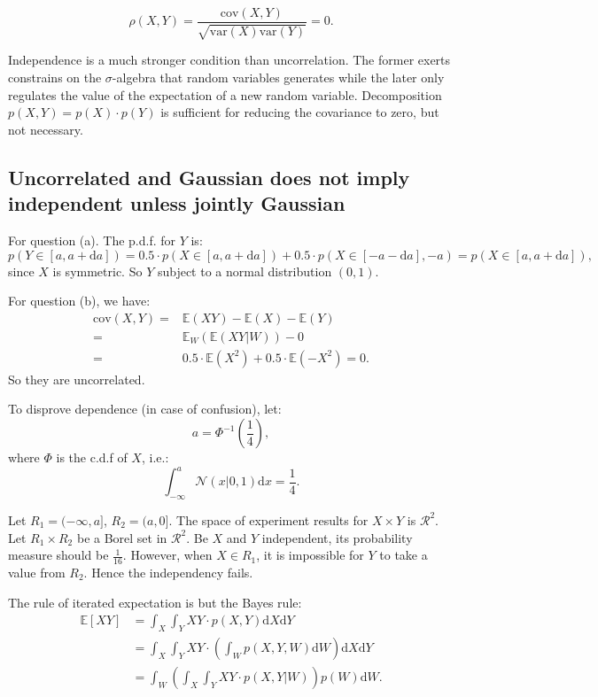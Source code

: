 \documentclass[UTF8]{ctexart}
\begin{document}
$$\rho(X,Y)=\frac{\text{cov}(X,Y)}{\sqrt{\text{var}(X)\text{var}(Y)}}=0.$$

Independence is a much stronger condition than uncorrelation.
The former exerts constrains on the $\sigma$-algebra that random variables generates while the later only regulates the value of the expectation of a new random variable.
Decomposition $p(X,Y)=p(X)\cdot p(Y)$ is sufficient for reducing the covariance to zero, but not necessary.

\subsection{Uncorrelated and Gaussian does not imply independent unless jointly Gaussian}
For question (a).
The p.d.f. for $Y$ is:
$$p(Y\in[a,a+\text{d}a])=0.5 \cdot p(X\in[a,a+\text{d}a]) + 0.5 \cdot p(X\in[-a-\text{d}a],-a)=p(X\in[a,a+\text{d}a]),$$
since $X$ is symmetric.
So $Y$ subject to a normal distribution $(0,1)$.

For question (b), we have:
\begin{align}
\text{cov}(X,Y)=&\mathbb{E}(XY)-\mathbb{E}(X)-\mathbb{E}(Y) \nonumber \\
=& \mathbb{E}_{W}(\mathbb{E}(XY|W)) - 0 \nonumber \\
=&0.5\cdot\mathbb{E}(X^{2})+0.5\cdot\mathbb{E}(-X^{2})=0. \nonumber
\end{align}
So they are uncorrelated.

To disprove dependence (in case of confusion), let:
$$a=\Phi^{-1}(\frac{1}{4}),$$
where $\Phi$ is the c.d.f of $X$, i.e.:
$$\int_{-\infty}^{a}\mathcal{N}(x|0,1)\text{d}x=\frac{1}{4}.$$

Let $R_{1}=(-\infty,a]$, $R_{2}=(a,0]$.
The space of experiment results for $X\times Y$ is $\mathcal{R}^{2}$.
Let $R_{1}\times R_{2}$ be a Borel set in $\mathcal{R}^{2}$.
Be $X$ and $Y$ independent, its probability measure should be $\frac{1}{16}$.
However, when $X\in R_{1}$, it is impossible for $Y$ to take a value from $R_{2}$. Hence the independency fails.

The rule of iterated expectation is but the Bayes rule:
$$
\begin{aligned}
\mathbb{E}[XY]&=\int_{X}\int_{Y}XY\cdot p(X,Y)\text{d}X\text{d}Y\\
&=\int_{X}\int_{Y}XY\cdot \left(\int_{W} p(X,Y,W)\text{d}W\right)\text{d}X\text{d}Y\\
&=\int_{W}\left(\int_{X}\int_{Y} XY\cdot p(X,Y|W)    \right)p(W)\text{d}W.
\end{aligned}
$$
\end{document}
